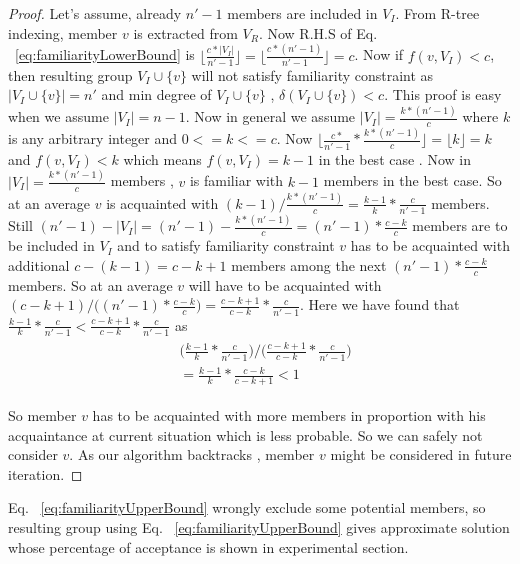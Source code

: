 \documentclass{vldb}
\begin{document}
		\begin{proof}
		Let's assume, already $ n'-1 $ members are included in $ V_I $. From R-tree indexing, member $ v $ is extracted from $ V_R $. Now R.H.S of Eq. ~\eqref{eq:familiarityLowerBound} is $ \big\lfloor\frac{c*|V_I|}{n'-1}\big\rfloor=\big\lfloor\frac{c*(n'-1)}{n'-1}\big\rfloor = c$.  Now if $ f(v,V_I)< c $, then resulting group $ V_I\cup\{v\} $ will not satisfy familiarity constraint as  $ |V_I\cup\{v\}|=n' $ and min degree of $ V_I\cup\{v\} $ , $ \delta(V_I\cup\{v\})<c $. This proof is easy when we assume $ |V_I|=n-1 $. Now in general we assume $ |V_I|=\frac{k*(n'-1)}{c} $ where $ k  $ is any arbitrary integer and $ 0<=k<=c $. Now $ \big\lfloor\frac{c*}{n'-1}*\frac{k*(n'-1)}{c}\big\rfloor =\big\lfloor k\big\rfloor=k$ and $ f(v,V_I)< k $ which means $ f(v,V_I)=k-1 $ in the best case . Now in $ |V_I|=\frac{k*(n'-1)}{c} $ members , $ v $ is familiar with $ k-1 $ members  in the best case. So at an average $ v $ is acquainted with $ (k-1)/\frac{k*(n'-1)}{c} =\frac{k-1}{k}*\frac{c}{n'-1}$ members. Still $ (n'-1)-|V_I| =(n'-1)-\frac{k*(n'-1)}{c}=(n'-1)*\frac{c-k}{c}$ members are to be included in $ V_I $ and to satisfy familiarity constraint $ v $ has to be acquainted with additional $ c-(k-1)=c-k+1 $ members among the next  $ (n'-1)*\frac{c-k}{c}  $ members. So at an average $ v $ will have to be acquainted with $ (c-k+1)/\big((n'-1)*\frac{c-k}{c}\big) =\frac{c-k+1}{c-k}*\frac{c}{n'-1}$. Here we have found that $ \frac{k-1}{k}*\frac{c}{n'-1} < \frac{c-k+1}{c-k}*\frac{c}{n'-1}$ as 
		\begin{equation*}
		\begin{aligned}
		\begin{split}
		&\bigg(\frac{k-1}{k}*\frac{c}{n'-1}\bigg) / \bigg(\frac{c-k+1}{c-k}*\frac{c}{n'-1} \bigg)		\\
		&= \frac{k-1}{k}*\frac{c-k}{c-k+1}<1
		\end{split}
		\end{aligned}
		\end{equation*}
		
		So member $ v $ has to be acquainted with more members in proportion with his acquaintance at current situation which is less probable. So we can safely not consider $ v $. As our algorithm backtracks , member $ v $ might be considered in future iteration.  
		\end{proof}
		
		Eq. ~\eqref{eq:familiarityUpperBound} wrongly exclude some potential members, so resulting group using Eq. ~\eqref{eq:familiarityUpperBound} gives approximate solution whose percentage of acceptance is shown in experimental section. 
		
\end{document}
